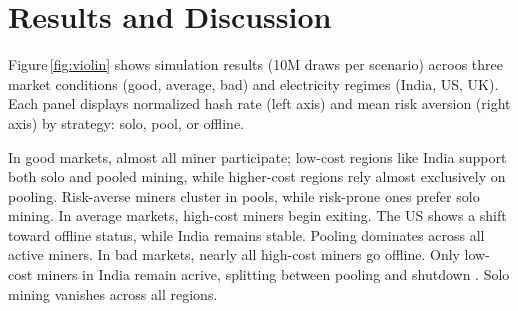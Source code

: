 \documentclass[12pt]{article}
\begin{document}
%


\section{Results and Discussion}
Figure\,\ref{fig:violin} shows simulation results (10M draws per scenario) acroos three market conditions (good, average, bad) and electricity regimes (India, US, UK). Each panel displays normalized hash rate (left axis) and mean risk aversion (right axis) by strategy: solo, pool, or offline.

In good markets, almost all miner participate; low-cost regions like India support both solo and pooled mining, while higher-cost regions rely almost exclusively on pooling. Risk-averse miners cluster in pools, while risk-prone ones prefer solo mining. In average markets, high-cost miners begin exiting. The US shows a shift toward offline status, while India remains stable. Pooling dominates across all active miners. In bad markets, nearly all high-cost miners go offline. Only low-cost miners in India remain acrive, splitting between pooling and shutdown . Solo mining vanishes across all regions.
\end{document}
